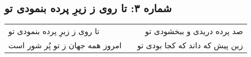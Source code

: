 \begin{center}
\section*{شماره ۳: تا روی ز زیرِ پرده بنمودی تو}
\label{sec:003}
\begin{longtable}{l p{0.5cm} r}
تا روی ز زیرِ پرده بنمودی تو
&&
صد پرده دریدی و ببخشودی تو
\\
امروز همه جهان ز تو پُر شور است
&&
زین پیش که داند که کجا بودی تو
\\
\end{longtable}
\end{center}
